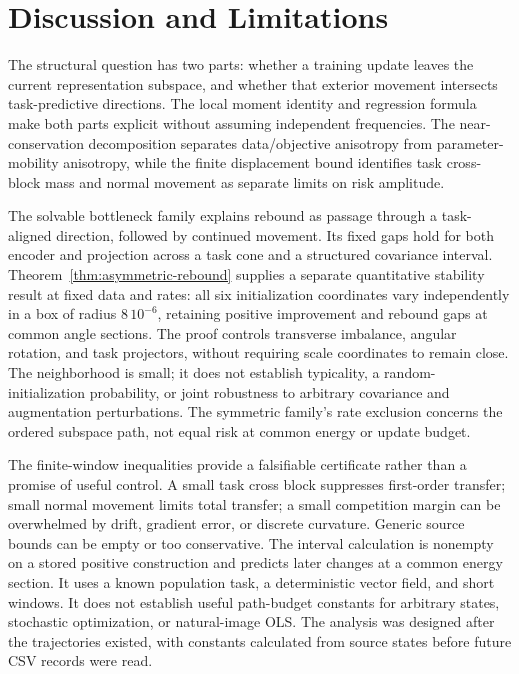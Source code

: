 \section{Discussion and Limitations}
The structural question has two parts: whether a training update leaves the current representation subspace, and whether that exterior movement intersects task-predictive directions. The local moment identity and regression formula make both parts explicit without assuming independent frequencies. The near-conservation decomposition separates data/objective anisotropy from parameter-mobility anisotropy, while the finite displacement bound identifies task cross-block mass and normal movement as separate limits on risk amplitude.

The solvable bottleneck family explains rebound as passage through a task-aligned direction, followed by continued movement. Its fixed gaps hold for both encoder and projection across a task cone and a structured covariance interval. Theorem~\ref{thm:asymmetric-rebound} supplies a separate quantitative stability result at fixed data and rates: all six initialization coordinates vary independently in a box of radius $8\,10^{-6}$, retaining positive improvement and rebound gaps at common angle sections. The proof controls transverse imbalance, angular rotation, and task projectors, without requiring scale coordinates to remain close. The neighborhood is small; it does not establish typicality, a random-initialization probability, or joint robustness to arbitrary covariance and augmentation perturbations. The symmetric family's rate exclusion concerns the ordered subspace path, not equal risk at common energy or update budget.

The finite-window inequalities provide a falsifiable certificate rather than a promise of useful control. A small task cross block suppresses first-order transfer; small normal movement limits total transfer; a small competition margin can be overwhelmed by drift, gradient error, or discrete curvature. Generic source bounds can be empty or too conservative. The interval calculation is nonempty on a stored positive construction and predicts later changes at a common energy section. It uses a known population task, a deterministic vector field, and short windows. It does not establish useful path-budget constants for arbitrary states, stochastic optimization, or natural-image OLS. The analysis was designed after the trajectories existed, with constants calculated from source states before future CSV records were read.

